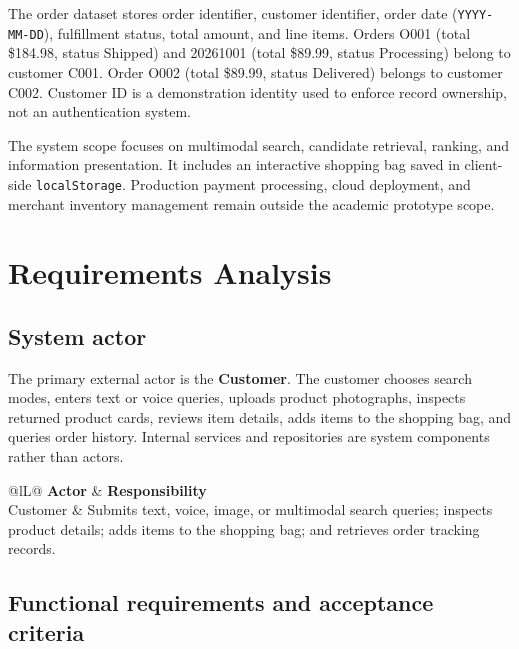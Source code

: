 \documentclass[12pt,a4paper]{article}
\begin{document}
The order dataset stores order identifier, customer identifier, order date (\texttt{YYYY-MM-DD}), fulfillment status, total amount, and line items. Orders O001 (total \$184.98, status Shipped) and 20261001 (total \$89.99, status Processing) belong to customer C001. Order O002 (total \$89.99, status Delivered) belongs to customer C002. Customer ID is a demonstration identity used to enforce record ownership, not an authentication system.

The system scope focuses on multimodal search, candidate retrieval, ranking, and information presentation. It includes an interactive shopping bag saved in client-side \texttt{localStorage}. Production payment processing, cloud deployment, and merchant inventory management remain outside the academic prototype scope.

\FloatBarrier
\section{Requirements Analysis}\label{sec:requirements}

\subsection{System actor}
The primary external actor is the \textbf{Customer}. The customer chooses search modes, enters text or voice queries, uploads product photographs, inspects returned product cards, reviews item details, adds items to the shopping bag, and queries order history. Internal services and repositories are system components rather than actors.

\begin{table}[htbp]\centering\small
\caption{System actor.}\label{tab:actor}
\begin{tabularx}{\textwidth}{@{}lL@{}}\toprule
\textbf{Actor} & \textbf{Responsibility} \\\midrule
Customer & Submits text, voice, image, or multimodal search queries; inspects product details; adds items to the shopping bag; and retrieves order tracking records. \\\bottomrule\end{tabularx}\end{table}

\subsection{Functional requirements and acceptance criteria}
\end{document}
